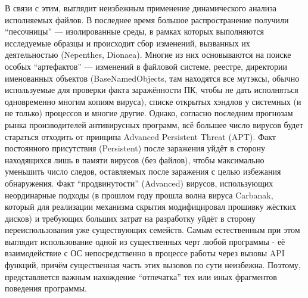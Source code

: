 В связи с этим, выглядит неизбежным применение динамического анализа исполняемых файлов. В последнее время большое распространение получили ``песочницы'' --- изолированные среды, в рамках которых выполняются исследуемые образцы и происходит сбор изменений, вызванных их деятельностью (Nepenthes, Dionaea). Многие из них основываются на поиске особых ``артефактов'' --- изменений в файловой системе, реестре, директории именованных объектов (BaseNamedObjects, там находятся все мутэксы, обычно используемые для проверки факта заражённости ПК, чтобы не дать исполняться одновременно многим копиям вируса), списке открытых хэндлов у системных (и не только) процессов и многие другие. Однако, согласно последним прогнозам рынка производителей антивирусных программ\cite{KASPERKSYBULLETIN}, всё большее число вирусов будет стараться отходить от принципа Advanced Persistent Threat (APT). Факт постоянного присутствия (Persistent) после заражения уйдёт в сторону находящихся лишь в памяти вирусов (без файлов), чтобы максимально уменьшить число следов, оставляемых после заражения с целью избежания обнаружения. Факт ``продвинутости'' (Advanced) вирусов, использующих неординарные подходы (в прошлом году прошла волна вируса Carbanak, который для реализации механизма скрытия модифицировал прошивку жёстких дисков) и требующих больших затрат на разработку уйдёт в сторону переиспользования уже существующих семейств. Самым естественным при этом выглядит использование одной из существенных черт любой программы - её взаимодействие с ОС непосредственно в процессе работы через вызовы API функций, причём существенная часть этих вызовов по сути неизбежна. Поэтому, представляется важным нахождение ``отпечатка'' тех или иных фрагментов поведения программы.